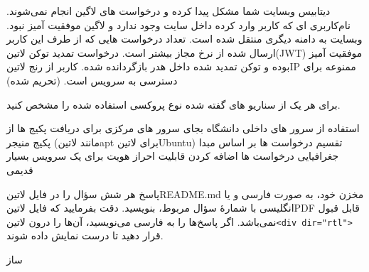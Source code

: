 \documentclass{../assignment}
\begin{document}
 دیتابیس وبسایت شما مشکل پیدا کرده و درخواست های لاگین انجام نمی‌شوند.
 نام‌کاربری ای که کاربر وارد کرده داخل سایت وجود ندارد و لاگین موفقیت آمیز نبود.
 وبسایت به دامنه دیگری منتقل شده است.
 تعداد درخواست هایی که از طرف این کاربر ارسال شده از نرخ مجاز بیشتر است.
 درخواست تمدید توکن ‌لاتین{(JWT)} موفقیت آمیز بوده و توکن تمدید شده داخل هدر بازگردانده شده.
 کاربر از رنج ‌لاتین{IP} ممنوعه برای دسترسی به سرویس است. (تحریم شده)


برای هر یک از سناریو های گفته شده نوع پروکسی استفاده شده را مشخص کنید.

 استفاده از سرور های داخلی دانشگاه بجای سرور های مرکزی برای دریافت پکیج ها از پکیج منیجر (مانند ‌لاتین{apt} برای ‌لاتین{Ubuntu})
 تقسیم درخواست ها بر اساس مبدا جغرافیایی درخواست ها
 اضافه کردن قابلیت احراز هویت برای یک سرویس بسیار قدیمی


پاسخ هر شش سؤال را در فایل ‌لاتین{README.md} مخزن خود، به صورت فارسی و یا انگلیسی با شمارهٔ سؤال مربوط، بنویسید.
دقت بفرمایید که فایل ‌لاتین{PDF} قابل قبول نمی‌باشد.
اگر پاسخ‌ها را به فارسی می‌نویسید، آن‌ها را درون ‌لاتین{\texttt{<div dir="rtl">}} قرار دهید تا درست نمایش داده شوند.


‌ساز
\end{document}
